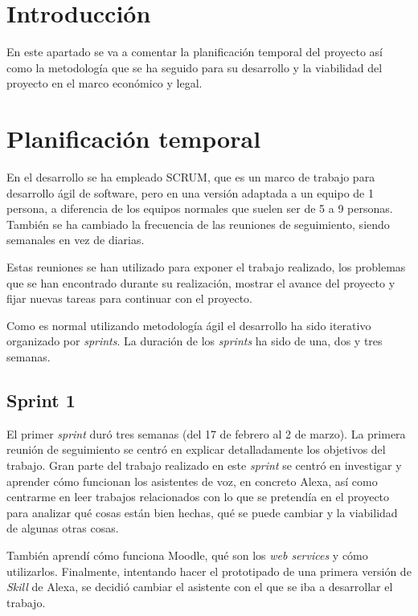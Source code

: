 
\section{Introducción}

En este apartado se va a comentar la planificación temporal del proyecto así como la metodología que se ha seguido para su desarrollo y la viabilidad del proyecto en el marco económico y legal.

\section{Planificación temporal}

En el desarrollo se ha empleado SCRUM, que es un marco de trabajo para desarrollo ágil de software, pero en una versión adaptada a un equipo de 1 persona, a diferencia de los equipos normales que suelen ser de 5 a 9 personas. También se ha cambiado la frecuencia de las reuniones de seguimiento, siendo semanales en vez de diarias.

Estas reuniones se han utilizado para exponer el trabajo realizado, los problemas que se han encontrado durante su realización, mostrar el avance del proyecto y fijar nuevas tareas para continuar con el proyecto.

Como es normal utilizando metodología ágil el desarrollo ha sido iterativo organizado por \textit{sprints}. La duración de los \textit{sprints} ha sido de una, dos y tres semanas.

\subsection{Sprint 1}

El primer \textit{sprint} duró tres semanas (del 17 de febrero al 2 de marzo). La primera reunión de seguimiento se centró en explicar detalladamente los objetivos del trabajo. Gran parte del trabajo realizado en este \textit{sprint} se centró en investigar y aprender cómo funcionan los asistentes de voz, en concreto Alexa, así como centrarme en leer trabajos relacionados con lo que se pretendía en el proyecto para analizar qué cosas están bien hechas, qué se puede cambiar y la viabilidad de algunas otras cosas.

También aprendí cómo funciona Moodle, qué son los \textit{web services} y cómo utilizarlos. Finalmente, intentando hacer el prototipado de una primera versión de \textit{Skill} de Alexa, se decidió cambiar el asistente con el que se iba a desarrollar el trabajo.

